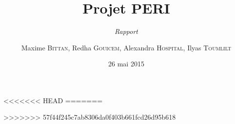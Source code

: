 \documentclass{scrreprt}
\begin{document}
\title{Projet PERI}
\subtitle{\textit{Rapport}}
\date{26 mai 2015}
\author{Maxime \textsc{Bittan}, Redha \textsc{Gouicem}, Alexandra \textsc{Hospital}, Ilyas \textsc{Toumlilt}}


<<<<<<< HEAD
%
%
=======
\maketitle


\tableofcontents \newpage




>>>>>>> 57f44f245c7ab8306da0f403b661fcd26d95b618



\end{document}

